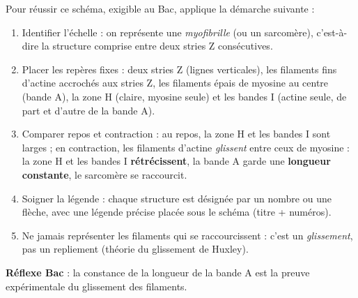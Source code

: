 \documentclass[11pt]{article}
\newcommand{\cle}[1]{{\popxbold\color{popdark}#1}}
\begin{document}
\begin{methode}
Pour réussir ce schéma, exigible au Bac, applique la démarche suivante :
\begin{enumerate}
\item \cle{Identifier l'échelle} : on représente une \emph{myofibrille} (ou un sarcomère), c'est-à-dire la structure comprise entre deux stries Z consécutives.
\item \cle{Placer les repères fixes} : deux stries Z (lignes verticales), les filaments fins d'\cle{actine} accrochés aux stries Z, les filaments épais de \cle{myosine} au centre (bande A), la zone H (claire, myosine seule) et les bandes I (actine seule, de part et d'autre de la bande A).
\item \cle{Comparer repos et contraction} : au repos, la zone H et les bandes I sont larges ; en contraction, les filaments d'actine \emph{glissent} entre ceux de myosine : la zone H et les bandes I \textbf{rétrécissent}, la bande A garde une \textbf{longueur constante}, le sarcomère se raccourcit.
\item \cle{Soigner la légende} : chaque structure est désignée par un nombre ou une flèche, avec une légende précise placée sous le schéma (titre + numéros).
\item \cle{Ne jamais} représenter les filaments qui se raccourcissent : c'est un \emph{glissement}, pas un repliement (théorie du glissement de Huxley).
\end{enumerate}
\textbf{Réflexe Bac} : la constance de la longueur de la bande A est la preuve expérimentale du glissement des filaments.
\end{methode}
\end{document}

